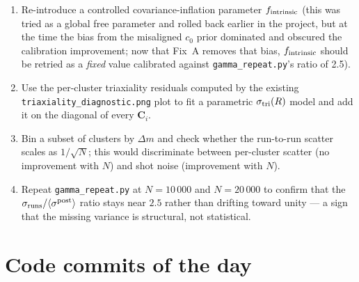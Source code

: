 \documentclass[11pt,a4paper]{article}
\begin{document}
\begin{enumerate}[noitemsep]
  \item Re-introduce a controlled covariance-inflation parameter
        $f_{\rm intrinsic}$ (this was tried as a global free parameter and
        rolled back earlier in the project, but at the time the bias from
        the misaligned $c_0$ prior dominated and obscured the calibration
        improvement; now that Fix~A removes that bias, $f_{\rm intrinsic}$
        should be retried as a \emph{fixed} value calibrated against
        \texttt{gamma\_repeat.py}'s ratio of 2.5).
  \item Use the per-cluster triaxiality residuals computed by the existing
        \texttt{triaxiality\_diagnostic.png} plot to fit a parametric
        $\sigma_{\rm tri}(R)$ model and add it on the diagonal of every
        $\mathbf{C}_i$.
  \item Bin a subset of clusters by $\Delta m$ and check whether the run-to-run
        scatter scales as $1/\sqrt{N}$; this would discriminate between
        per-cluster scatter (no improvement with $N$) and shot noise
        (improvement with $N$).
  \item Repeat \texttt{gamma\_repeat.py} at $N=10\,000$ and $N=20\,000$ to
        confirm that the $\sigma_{\rm runs}/\langle\sigma^{\rm post}\rangle$
        ratio stays near $2.5$ rather than drifting toward unity --- a sign
        that the missing variance is structural, not statistical.
\end{enumerate}

\section{Code commits of the day}
\end{document}
